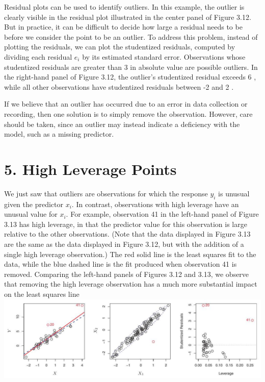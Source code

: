 \documentclass[10pt]{article}
\begin{document}
Residual plots can be used to identify outliers. In this example, the outlier is clearly visible in the residual plot illustrated in the center panel of Figure 3.12. But in practice, it can be difficult to decide how large a residual needs to be before we consider the point to be an outlier. To address this problem, instead of plotting the residuals, we can plot the studentized residuals, computed by dividing each residual $e_{i}$ by its estimated standard error. Observations whose studentized residuals are greater than 3 in absolute value are possible outliers. In the right-hand panel of Figure 3.12, the outlier's studentized residual exceeds 6 , while all other observations have studentized residuals between -2 and 2 .

If we believe that an outlier has occurred due to an error in data collection or recording, then one solution is to simply remove the observation. However, care should be taken, since an outlier may instead indicate a deficiency with the model, such as a missing predictor.

\section*{5. High Leverage Points}
We just saw that outliers are observations for which the response $y_{i}$ is unusual given the predictor $x_{i}$. In contrast, observations with high leverage have an unusual value for $x_{i}$. For example, observation 41 in the left-hand panel of Figure 3.13 has high leverage, in that the predictor value for this observation is large relative to the other observations. (Note that the data displayed in Figure 3.13 are the same as the data displayed in Figure 3.12, but with the addition of a single high leverage observation.) The red solid line is the least squares fit to the data, while the blue dashed line is the fit produced when observation 41 is removed. Comparing the left-hand panels of Figures 3.12 and 3.13, we observe that removing the high leverage observation has a much more substantial impact on the least squares line\\
\includegraphics[max width=\textwidth, center]{2025_05_05_efe77898333945044de4g-113}
\end{document}
